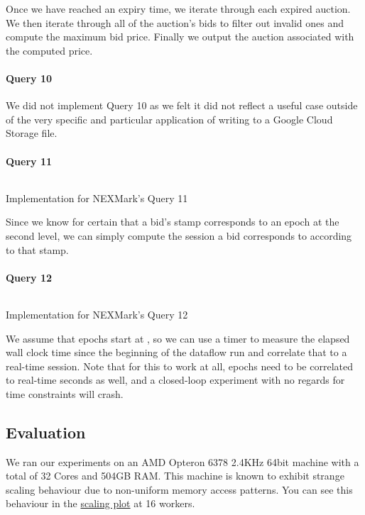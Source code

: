 Once we have reached an expiry time, we iterate through each expired auction. We then iterate through all of the auction's bids to filter out invalid ones and compute the maximum bid price. Finally we output the auction associated with the computed price.

\paragraph{Query 10}
We did not implement Query 10 as we felt it did not reflect a useful case outside of the very specific and particular application of writing to a Google Cloud Storage file.

\paragraph{Query 11}
\begin{listing}[H]
  \inputminted[firstline=784,lastline=787]{rust}{benchmarks/src/nexmark.rs}
  \caption{Implementation for NEXMark's Query 11}
  \label{lst:nexmark-query11}
\end{listing}

Since we know for certain that a bid's  stamp corresponds to an epoch at the second level, we can simply compute the session a bid corresponds to according to that stamp.

\paragraph{Query 12}
\begin{listing}[H]
  \inputminted[firstline=810,lastline=817]{rust}{benchmarks/src/nexmark.rs}
  \caption{Implementation for NEXMark's Query 12}
  \label{lst:nexmark-query12}
\end{listing}

We assume that epochs start at , so we can use a timer to measure the elapsed wall clock time since the beginning of the dataflow run and correlate that to a real-time session. Note that for this to work at all, epochs need to be correlated to real-time seconds as well, and a closed-loop experiment with no regards for time constraints will crash.

\subsection{Evaluation}
We ran our experiments on an AMD Opteron 6378 2.4KHz 64bit machine with a total of 32 Cores and 504GB RAM. This machine is known to exhibit strange scaling behaviour due to non-uniform memory access patterns. You can see this behaviour in the \hyperref[figure:ysb-scaling]{scaling plot} at 16 workers. \\

